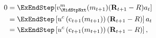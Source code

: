   \begin{equation}\begin{gathered}\begin{aligned}
        0  & = \ExEndStep[{\vFunc}_{\MidStpNxt}^{m}(m_{t+1})(\Risky_{t+1}-\Rfree){a}_{t}] \notag
        \\         & = \ExEndStep\left[\uFunc^{c}\left(\cFunc_{t+1}(m_{t+1})\right)(\Risky_{t+1}-\Rfree)\right]{a}_{t}
        \\         & = \ExEndStep\left[\uFunc^{c}\left(\cFunc_{t+1}(m_{t+1})\right)(\Risky_{t+1}-\Rfree)\right], \label{eq:FOCw}
      \end{aligned}\end{gathered}\end{equation}
